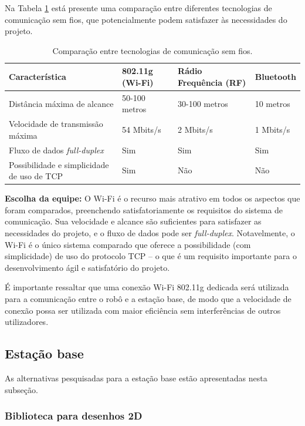 Na Tabela \ref{tab:alternativas_comunicacao} está presente uma comparação entre diferentes tecnologias de comunicação sem fios, que potencialmente podem satisfazer às necessidades do projeto. 


\begin{table}[h]
  \caption{Comparação entre tecnologias de comunicação sem fios.}
  \centering
  \begin{tabular}{p{4.5cm}|p{3cm}p{4cm}p{2cm}}
    \toprule
    \textbf{Característica} & \textbf{802.11g (Wi-Fi)} & \multicolumn{1}{l}{\textbf{Rádio Frequência (RF)}} & \textbf{Bluetooth}  \\
    \hline
    Distância máxima de alcance & 50-100 metros  & 30-100 metros & 10 metros \\
    \hline
    Velocidade de transmissão máxima & 54 Mbits/s & 2 Mbits/s & 1 Mbits/s \\
    \hline
    Fluxo de dados \textit{full-duplex} & Sim & Sim & Sim \\
    \hline
    Possibilidade e simplicidade de uso de TCP & Sim & Não & Não \\
    \bottomrule
  \end{tabular}
  \label{tab:alternativas_comunicacao}
\end{table}

\textbf{Escolha da equipe:} O Wi-Fi é o recurso mais atrativo em todos os aspectos que foram comparados, preenchendo satisfatoriamente os requisitos do sistema de comunicação. Sua velocidade e alcance são suficientes para satisfazer as necessidades do projeto, e o fluxo de dados pode ser \textit{full-duplex}. Notavelmente, o Wi-Fi é o único sistema comparado que oferece a possibilidade (com simplicidade) de uso do protocolo TCP -- o que é um requisito importante para o desenvolvimento ágil e satisfatório do projeto.

É importante ressaltar que uma conexão Wi-Fi 802.11g dedicada será utilizada para a comunicação entre o robô e a estação base, de modo que a velocidade de conexão possa ser utilizada com maior eficiência sem interferências de outros utilizadores.

\subsection{Estação base}

As alternativas pesquisadas para a estação base estão apresentadas nesta subseção.

\subsubsection{Biblioteca para desenhos 2D}
\label{subsec:alternativas_desenho}

